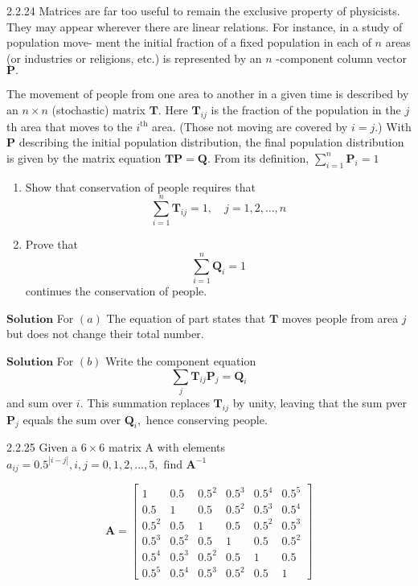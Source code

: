 \begin{mybox}{2.2.24}
Matrices are far too useful to remain the exclusive property of physicists. They may
appear wherever there are linear relations. For instance, in a study of population move-
ment the initial fraction of a fixed population in each of $n$ areas (or industries or
religions, etc.) is represented by an $n$ -component column vector $\mathbf{P} .$ 

The movement of people from one area to another in a given time is described by an $n \times n$ (stochastic) matrix $\mathbf{T}$. Here $\mathbf{T}_{i j}$ is the fraction of the population in the $j$ th area that moves to the $i^{\text{th}}$ area. (Those not moving are covered by $i=j.$) With $\mathbf{P}$ describing the initial population distribution, the final population distribution is given by the matrix equation $\mathbf{TP}=\mathbf{Q}$. From its definition, $\sum_{i=1}^{n} \mathbf{P}_{i}=1$

\begin{enumerate}[$(a)$]
\item Show that conservation of people requires that
$$
\sum_{i=1}^{n} \mathbf{T}_{i j}=1, \quad j=1,2, \ldots, n
$$
\item Prove that
$$
\sum_{i=1}^{n} \mathbf{Q}_{i}=1
$$
continues the conservation of people.
\end{enumerate}
\end{mybox}




$\boxed{\textbf{Solution}}$  For $(a)$ The equation of part states that $\mathbf{T}$ moves people from area $j$ but
does not change their total number. 



$\boxed{\textbf{Solution}}$ For $(b)$ Write the component equation 
$$\sum_{j} \mathbf{T}_{i j} \mathbf{P}_{j}=\mathbf{Q}_{i}$$ 
and sum over $i.$ This summation replaces $\mathbf{T}_{i j}$ by unity, leaving that the sum pver $\mathbf{P}_{j}$ equals the sum over $\mathbf{Q}_{i},$ hence conserving people.


\newpage

\begin{mybox}{2.2.25}
Given a $6 \times 6$ matrix A with elements $a_{i j}=0.5^{|i-j|}, i, j=0,1,2, \ldots, 5, \text { find } \mathbf{A}^{-1}$

$$\mathbf{A}=\begin{bmatrix}
1 & 0.5 & 0.5^2 & 0.5^3 & 0.5^4 & 0.5^5 \\ 
0.5 & 1 & 0.5 & 0.5^2 & 0.5^3 & 0.5^4 \\ 
0.5^2 & 0.5 & 1 & 0.5 & 0.5^2 & 0.5^3\\ 
0.5^3 & 0.5^2 & 0.5 & 1 & 0.5 & 0.5^2\\ 
0.5^4 & 0.5^3 & 0.5^2 & 0.5 & 1 & 0.5\\ 
0.5^5 & 0.5^4 & 0.5^3 & 0.5^2 & 0.5 & 1
\end{bmatrix}$$
\end{mybox}

